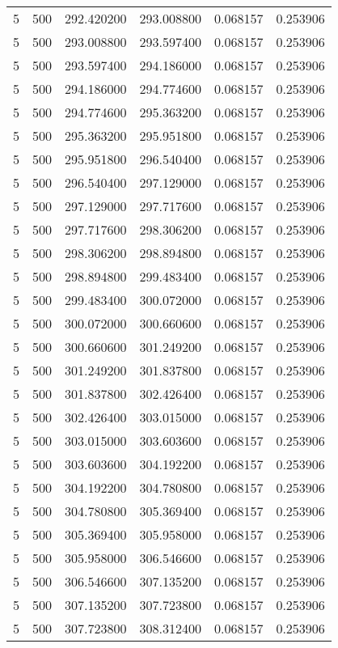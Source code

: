 \begin{longtable}{rrrrrr}
5 & 500 & 292.420200 & 293.008800 & 0.068157 & 0.253906 \\
5 & 500 & 293.008800 & 293.597400 & 0.068157 & 0.253906 \\
5 & 500 & 293.597400 & 294.186000 & 0.068157 & 0.253906 \\
5 & 500 & 294.186000 & 294.774600 & 0.068157 & 0.253906 \\
5 & 500 & 294.774600 & 295.363200 & 0.068157 & 0.253906 \\
5 & 500 & 295.363200 & 295.951800 & 0.068157 & 0.253906 \\
5 & 500 & 295.951800 & 296.540400 & 0.068157 & 0.253906 \\
5 & 500 & 296.540400 & 297.129000 & 0.068157 & 0.253906 \\
5 & 500 & 297.129000 & 297.717600 & 0.068157 & 0.253906 \\
5 & 500 & 297.717600 & 298.306200 & 0.068157 & 0.253906 \\
5 & 500 & 298.306200 & 298.894800 & 0.068157 & 0.253906 \\
5 & 500 & 298.894800 & 299.483400 & 0.068157 & 0.253906 \\
5 & 500 & 299.483400 & 300.072000 & 0.068157 & 0.253906 \\
5 & 500 & 300.072000 & 300.660600 & 0.068157 & 0.253906 \\
5 & 500 & 300.660600 & 301.249200 & 0.068157 & 0.253906 \\
5 & 500 & 301.249200 & 301.837800 & 0.068157 & 0.253906 \\
5 & 500 & 301.837800 & 302.426400 & 0.068157 & 0.253906 \\
5 & 500 & 302.426400 & 303.015000 & 0.068157 & 0.253906 \\
5 & 500 & 303.015000 & 303.603600 & 0.068157 & 0.253906 \\
5 & 500 & 303.603600 & 304.192200 & 0.068157 & 0.253906 \\
5 & 500 & 304.192200 & 304.780800 & 0.068157 & 0.253906 \\
5 & 500 & 304.780800 & 305.369400 & 0.068157 & 0.253906 \\
5 & 500 & 305.369400 & 305.958000 & 0.068157 & 0.253906 \\
5 & 500 & 305.958000 & 306.546600 & 0.068157 & 0.253906 \\
5 & 500 & 306.546600 & 307.135200 & 0.068157 & 0.253906 \\
5 & 500 & 307.135200 & 307.723800 & 0.068157 & 0.253906 \\
5 & 500 & 307.723800 & 308.312400 & 0.068157 & 0.253906 \\

\end{longtable}

